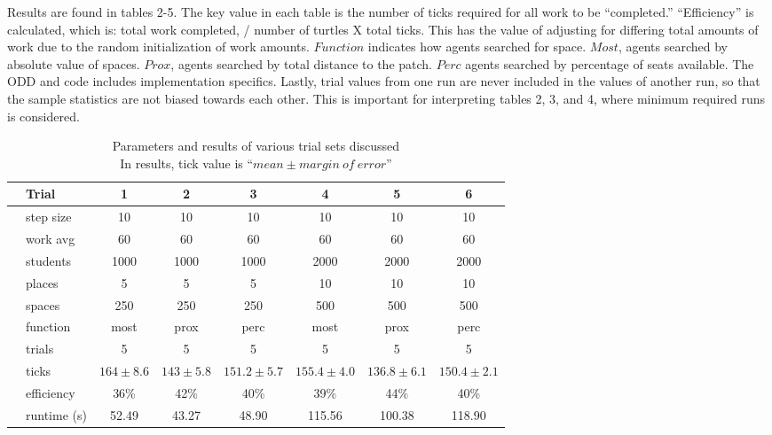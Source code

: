 \documentclass[11pt]{article} %
\begin{document}
Results are found in tables 2-5. The key value in each table is the number of ticks required for all work to be ``completed.'' ``Efficiency'' is calculated, which is:  total work completed, / number of turtles X total ticks. This has the value of adjusting for differing total amounts of work due to the random initialization of work amounts. $Function$ indicates how agents searched for space. $Most$, agents searched by absolute value of spaces. $Prox$, agents searched by total distance to the patch. $Perc$ agents searched by percentage of seats available. The ODD and code includes implementation specifics. Lastly, trial values from one run are never included in the values of another run, so that the sample statistics are not biased towards each other. This is important for interpreting tables 2, 3, and 4, where  minimum required runs is considered. 


\begin{table}[]
\footnotesize
\centering
\begin{tabular}{l|l|ccc|ccc}
 & Trial & 1 & 2 & 3 & 4 & 5 & 6  \\ \hline
  \parbox[t]{2mm}{} 
 & step size 	& 10  			& 10  			& 10 			& 10 					& 10 				& 10  \\
 & work avg 	& 60 			&  60 			& 60			& 60 					& 60 				& 60 \\
 & students 	& 1000 			& 1000 			& 1000 			& 2000 					& 2000 				& 2000 \\
 & places 		& 5 			& 5 			& 5 			& 10 					& 10 				& 10 \\
 & spaces 		& 250 			& 250 			& 250 			& 500 					& 500 				& 500 \\
 & function 	& most 			& prox 			& perc 			& most 					& prox 				& perc \\
 & trials 		& 5 			& 5 			& 5 			& 5 					& 5 				& 5 \\ \hline
\parbox[t]{2mm}{} 
 & ticks 		& $164\pm 8.6$ 	& $143\pm 5.8$ 	& $151.2\pm 5.7$	& $155.4\pm 4.0$	& $136.8\pm 6.1$	& $150.4\pm 2.1$ \\
 & efficiency 	& 36\%			& 42\%			& 40\%				& 39\%				& 44\%				& 40\% \\
 & runtime (s) 	& 52.49			& 43.27			& 48.90				& 115.56			& 100.38			& 118.90
\end{tabular}
\caption{Parameters and results of various trial sets discussed \\ \footnotesize In results, tick value is ``$mean \pm margin \: of \: error$''}
\end{table}
\end{document}
